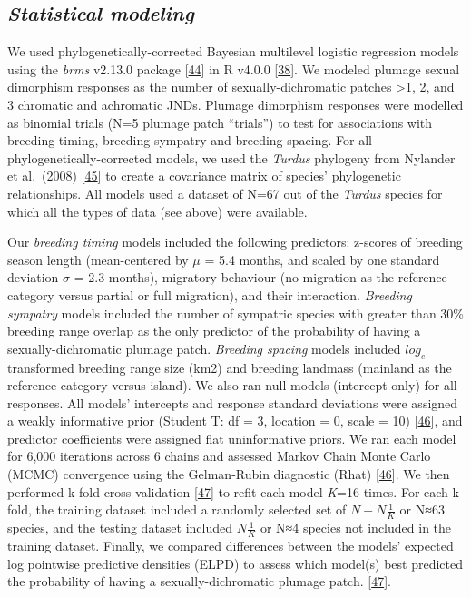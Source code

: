 \documentclass[
  a4paper,
]{article}
\begin{document}
\hypertarget{statistical-modeling}{%
\subsection{\texorpdfstring{\emph{Statistical
modeling}}{Statistical modeling}}\label{statistical-modeling}}

We used phylogenetically-corrected Bayesian multilevel logistic
regression models using the \emph{brms} v2.13.0 package
{[}\protect\hyperlink{ref-burkner2017}{44}{]} in R v4.0.0
{[}\protect\hyperlink{ref-rcoreteam2020}{38}{]}⁠. We modeled plumage
sexual dimorphism responses as the number of sexually-dichromatic
patches \textgreater1, 2, and 3 chromatic and achromatic JNDs. Plumage
dimorphism responses were modelled as binomial trials (N=5 plumage patch
``trials'') to test for associations with breeding timing, breeding
sympatry and breeding spacing. For all phylogenetically-corrected
models, we used the \emph{Turdus} phylogeny from Nylander et al.~(2008)
{[}\protect\hyperlink{ref-nylander2008}{45}{]} to create a covariance
matrix of species' phylogenetic relationships. All models used a dataset
of N=67 out of the \emph{Turdus} species for which all the types of data
(see above) were available.

Our \emph{breeding timing} models included the following predictors:
z-scores of breeding season length (mean-centered by \(\mu\) = 5.4
months, and scaled by one standard deviation \(\sigma\) = 2.3 months),
migratory behaviour (no migration as the reference category versus
partial or full migration), and their interaction. \emph{Breeding
sympatry} models included the number of sympatric species with greater
than 30\% breeding range overlap as the only predictor of the
probability of having a sexually-dichromatic plumage patch.
\emph{Breeding spacing} models included \(log_{e}\) transformed breeding
range size (km2) and breeding landmass (mainland as the reference
category versus island). We also ran null models (intercept only) for
all responses. All models' intercepts and response standard deviations
were assigned a weakly informative prior (Student T: df = 3, location =
0, scale = 10) {[}\protect\hyperlink{ref-gelman2013}{46}{]}, and
predictor coefficients were assigned flat uninformative priors. We ran
each model for 6,000 iterations across 6 chains and assessed Markov
Chain Monte Carlo (MCMC) convergence using the Gelman-Rubin diagnostic
(Rhat) {[}\protect\hyperlink{ref-gelman2013}{46}{]}. We then performed
k-fold cross-validation {[}\protect\hyperlink{ref-vehtari2017}{47}{]} to
refit each model \emph{K}=16 times. For each k-fold, the training
dataset included a randomly selected set of \(N- N\frac{1}{K}\) or N≈63
species, and the testing dataset included \(N\frac{1}{K}\) or N≈4
species not included in the training dataset. Finally, we compared
differences between the models' expected log pointwise predictive
densities (ELPD) to assess which model(s) best predicted the probability
of having a sexually-dichromatic plumage patch.
{[}\protect\hyperlink{ref-vehtari2017}{47}{]}⁠.
\end{document}
